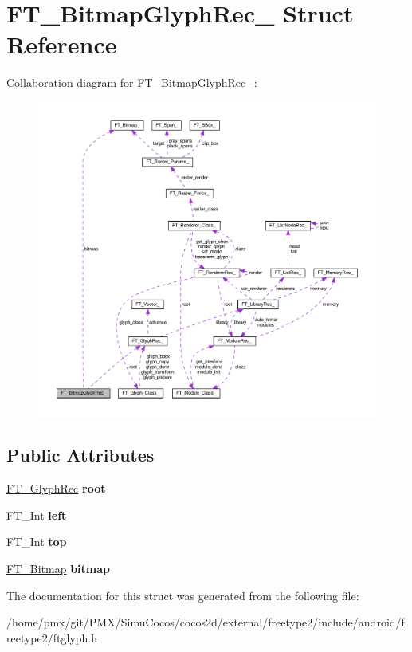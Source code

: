 \hypertarget{structFT__BitmapGlyphRec__}{}\section{F\+T\+\_\+\+Bitmap\+Glyph\+Rec\+\_\+ Struct Reference}
\label{structFT__BitmapGlyphRec__}


Collaboration diagram for F\+T\+\_\+\+Bitmap\+Glyph\+Rec\+\_\+\+:
\nopagebreak
\begin{figure}[H]
\begin{center}
\leavevmode
\includegraphics[width=350pt]{structFT__BitmapGlyphRec____coll__graph}
\end{center}
\end{figure}
\subsection*{Public Attributes}
\begin{DoxyCompactItemize}
\item 
\mbox{\label{structFT__BitmapGlyphRec___ac3970353fbc0fe3d4c59c3fd608140f3}} 
\hyperlink{structFT__GlyphRec__}{F\+T\+\_\+\+Glyph\+Rec} {\bfseries root}
\item 
\mbox{\label{structFT__BitmapGlyphRec___a6cfd2d89af7b6be4af886047c9cb7e0a}} 
F\+T\+\_\+\+Int {\bfseries left}
\item 
\mbox{\label{structFT__BitmapGlyphRec___a25fc81296678d6a2d064843c01bc05f7}} 
F\+T\+\_\+\+Int {\bfseries top}
\item 
\mbox{\label{structFT__BitmapGlyphRec___a16ecd0725920f8d5ad4c14e9448126ad}} 
\hyperlink{structFT__Bitmap__}{F\+T\+\_\+\+Bitmap} {\bfseries bitmap}
\end{DoxyCompactItemize}


The documentation for this struct was generated from the following file\+:\begin{DoxyCompactItemize}
\item 
/home/pmx/git/\+P\+M\+X/\+Simu\+Cocos/cocos2d/external/freetype2/include/android/freetype2/ftglyph.\+h\end{DoxyCompactItemize}

